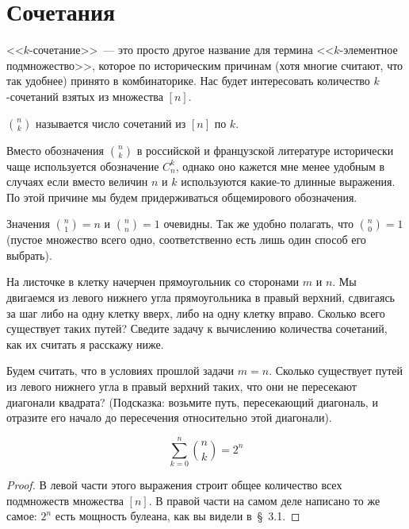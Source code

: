 \section{Сочетания}

<<$k$-сочетание>>~--- это просто другое название для термина <<$k$-элементное подмножество>>, которое по историческим причинам (хотя многие считают, что так удобнее) принято в комбинаторике. Нас будет интересовать количество $k$-сочетаний взятых из множества $[n]$.

\begin{definition}
 $n \choose k$ называется число сочетаний из $[n]$ по $k$.
\end{definition}

Вместо обозначения ${n \choose k}$ в российской и французской литературе исторически чаще используется обозначение $C^k_n$, однако оно кажется мне менее удобным в случаях если вместо величин $n$ и $k$ используются какие-то длинные выражения. По этой причине мы будем придерживаться общемирового обозначения.

Значения ${n \choose 1} = n$ и ${n \choose n} = 1$ очевидны. Так же удобно полагать, что ${n \choose 0} =1$ (пустое множество всего одно, соответственно есть лишь один способ его выбрать). 

\begin{exercise}
На листочке в клетку начерчен прямоугольник со сторонами $m$ и $n$. Мы двигаемся из левого нижнего угла прямоугольника в правый верхний, сдвигаясь за шаг либо на одну клетку вверх, либо на одну клетку вправо. Сколько всего существует таких путей? Сведите задачу к вычислению количества сочетаний, как их считать я расскажу ниже.
\end{exercise}

\begin{exercise}
Будем считать, что в условиях прошлой задачи $m=n$. Сколько существует путей из левого нижнего угла в правый верхний таких, что они не пересекают диагонали квадрата? (Подсказка: возьмите путь, пересекающий диагональ, и отразите его начало до пересечения относительно этой диагонали).
\end{exercise}

\begin{thm}
$$\sum_{k=0}^n{n \choose k} = 2^n$$
\end{thm}
\begin{proof}
В левой части этого выражения строит общее количество всех подмножеств множества $[n]$. В правой части на самом деле написано то же самое: $2^n$ есть мощность булеана, как вы видели в~\S~3.1.
\end{proof}

